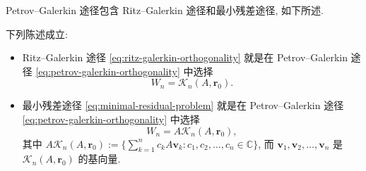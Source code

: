 \leavevmode{}\label{idx:sample:inclusions}Petrov--Galerkin 途径包含 Ritz--Galerkin 途径和最小残差途径, 如下所述.

\begin{Proposition}\label{prop:projection-equivalences}
下列陈述成立:
\begin{itemize}
\item Ritz--Galerkin 途径 \eqref{eq:ritz-galerkin-orthogonality} 就是在 Petrov--Galerkin 途径 \eqref{eq:petrov-galerkin-orthogonality} 中选择
\[
W_n=\mathcal K_n(A,\bm r_0).
\]
\item 最小残差途径 \eqref{eq:minimal-residual-problem} 就是在 Petrov--Galerkin 途径 \eqref{eq:petrov-galerkin-orthogonality} 中选择
\begin{equation}\label{eq:minimal-residual-test-space}
W_n=A\mathcal K_n(A,\bm r_0),
\end{equation}
其中 $A\mathcal K_n(A,\bm r_0):=\{\sum_{k=1}^n c_kA\bm v_k:c_1,c_2,\ldots,c_n\in\mathbb C\}$, 而 $\bm v_1,\bm v_2,\ldots,\bm v_n$ 是 $\mathcal K_n(A,\bm r_0)$ 的基向量.
\end{itemize}
\end{Proposition}

